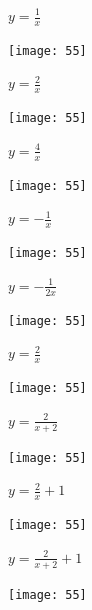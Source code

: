 \documentclass[a4paper]{oblivoir}
\begin{document}
\clearpage
\begin{minipage}{0.45\textwidth}\centering
\(y=\frac1x\)
\par\bigskip\texttt{[image: 55]}
\end{minipage}
\begin{minipage}{0.45\textwidth}\centering
\(y=\frac2x\)
\par\bigskip\texttt{[image: 55]}
\end{minipage}\bigskip\bigskip\par
\begin{minipage}{0.45\textwidth}\centering
\(y=\frac4x\)
\par\bigskip\texttt{[image: 55]}
\end{minipage}
\begin{minipage}{0.45\textwidth}\centering
\(y=-\frac1{x}\)
\par\bigskip\texttt{[image: 55]}
\end{minipage}\bigskip\bigskip\par
\begin{minipage}{0.45\textwidth}\centering
\(y=-\frac1{2x}\)
\par\bigskip\texttt{[image: 55]}
\end{minipage}\bigskip\bigskip\par

\clearpage
\begin{minipage}{0.45\textwidth}\centering
\(y=\frac2x\)
\par\bigskip\texttt{[image: 55]}
\end{minipage}
\begin{minipage}{0.45\textwidth}\centering
\(y=\frac2{x+2}\)
\par\bigskip\texttt{[image: 55]}
\end{minipage}\bigskip\bigskip\par
\begin{minipage}{0.45\textwidth}\centering
\(y=\frac2x+1\)
\par\bigskip\texttt{[image: 55]}
\end{minipage}
\begin{minipage}{0.45\textwidth}\centering
\(y=\frac2{x+2}+1\)
\par\bigskip\texttt{[image: 55]}
\end{minipage}\bigskip\bigskip\par
\end{document}
